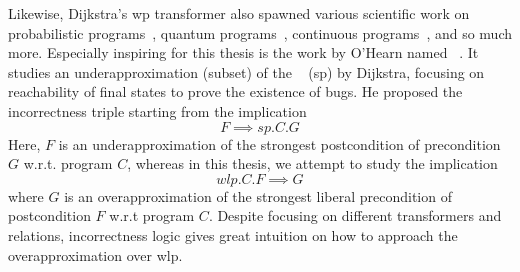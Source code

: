 Likewise, Dijkstra's wp transformer also spawned various scientific work on probabilistic programs~\cite{kaminski2016weakest}, quantum programs~\cite{boreale20}, continuous programs~\cite{liu22}, and so much more.
Especially inspiring for this thesis is the work by O'Hearn named ~\cite{ohearn2020IncorrectnessLogic}. 
It studies an underapproximation (subset) of the ~\cite{dijkstra90} (sp) by Dijkstra, focusing on reachability of final states to prove the existence of bugs. 
He proposed the incorrectness triple starting from the implication 
$$F\implies sp.C.G$$
Here, $F$ is an underapproximation of the strongest postcondition of precondition $G$ w.r.t. program $C$, whereas in this thesis, we attempt to study the implication 
$$wlp.C.F\implies G$$ 
where $G$ is an overapproximation of the strongest liberal precondition of postcondition $F$ w.r.t program $C$. 
Despite focusing on different transformers and relations, incorrectness logic gives great intuition on how to approach the overapproximation over wlp.


